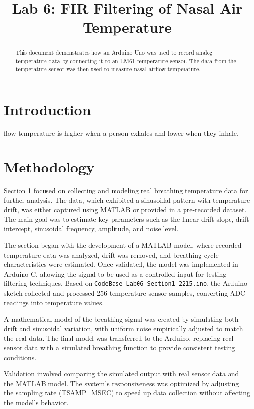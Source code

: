 \documentclass[journal]{IEEEtran}
\title{Lab 6: FIR Filtering of Nasal Air Temperature}
\author{
    \IEEEauthorblockN{Argenis Aquino, Rachel DuBois, Diego Lopez, Jonathan Sumner}
    \IEEEauthorblockA{
        Department of Engineering Technology, Rochester Institute of Technology\\
        1 Lomb Memorial Drive, Rochester, NY 14623, USA
    }
}
\begin{document}
\maketitle

\begin{abstract}
    This document demonstrates how an Arduino Uno was used to record analog temperature data by connecting it to an LM61 temperature sensor. The data from the temperature sensor was then used to measure nasal airflow temperature.
\end{abstract}

\section{Introduction}
 flow temperature is higher when a person exhales and lower when they inhale.

\section{Methodology}
Section 1 focused on collecting and modeling real breathing temperature data for further analysis. The data, which exhibited a sinusoidal pattern with temperature drift, was either captured using MATLAB or provided in a pre-recorded dataset. The main goal was to estimate key parameters such as the linear drift slope, drift intercept, sinusoidal frequency, amplitude, and noise level.

The section began with the development of a MATLAB model, where recorded temperature data was analyzed, drift was removed, and breathing cycle characteristics were estimated. Once validated, the model was implemented in Arduino C, allowing the signal to be used as a controlled input for testing filtering techniques. Based on \texttt{CodeBase\_Lab06\_Section1\_2215.ino}, the Arduino sketch collected and processed 256 temperature sensor samples, converting ADC readings into temperature values.

A mathematical model of the breathing signal was created by simulating both drift and sinusoidal variation, with uniform noise empirically adjusted to match the real data. The final model was transferred to the Arduino, replacing real sensor data with a simulated breathing function to provide consistent testing conditions.

Validation involved comparing the simulated output with real sensor data and the MATLAB model. The system's responsiveness was optimized by adjusting the sampling rate (TSAMP\_MSEC) to speed up data collection without affecting the model's behavior.
\end{document}
